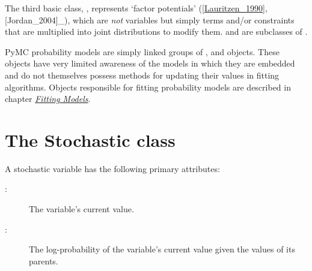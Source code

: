 \documentclass[letterpaper,10pt,english]{sphinxmanual}
\begin{document}
The third basic class, , represents `factor potentials' ({\hyperref[references:lauritzen-1990]{{[}Lauritzen\_1990{]}}},{[}Jordan\_2004{]}\_), which are \emph{not} variables but simply terms and/or constraints that are multiplied into joint distributions to modify them.  and  are subclasses of .

PyMC probability models are simply linked groups of ,  and  objects. These objects have very limited awareness of the models in which they are embedded and do not themselves possess methods for updating their values in fitting algorithms. Objects responsible for fitting probability models are described in chapter {\hyperref[modelfitting:chap-modelfitting]{\emph{Fitting Models}}}.


\section{The Stochastic class}
\label{modelbuilding:stochastic}\label{modelbuilding:the-stochastic-class}
A stochastic variable has the following primary attributes:
\begin{description}
\item[{:}] \leavevmode
The variable's current value.

\item[{:}] \leavevmode
The log-probability of the variable's current value given the values of its
parents.

\end{description}
\end{document}
